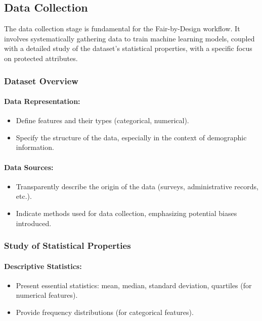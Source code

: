 \subsection{Data Collection}
\label{subsection:data_collection}

The data collection stage is fundamental for the Fair-by-Design workflow. It involves systematically gathering data to train machine learning models, coupled with a detailed study of the dataset's statistical properties, with a specific focus on protected attributes.

\subsubsection{Dataset Overview}

\paragraph{Data Representation:}
\begin{itemize}
    \item Define features and their types (categorical, numerical).
    \item Specify the structure of the data, especially in the context of demographic information.
\end{itemize}

\paragraph{Data Sources:}
\begin{itemize}
    \item Transparently describe the origin of the data (surveys, administrative records, etc.).
    \item Indicate methods used for data collection, emphasizing potential biases introduced.
\end{itemize}

\subsubsection{Study of Statistical Properties}

\paragraph{Descriptive Statistics:}
\begin{itemize}
    \item Present essential statistics: mean, median, standard deviation, quartiles (for numerical features).
    \item Provide frequency distributions (for categorical features).
\end{itemize}

